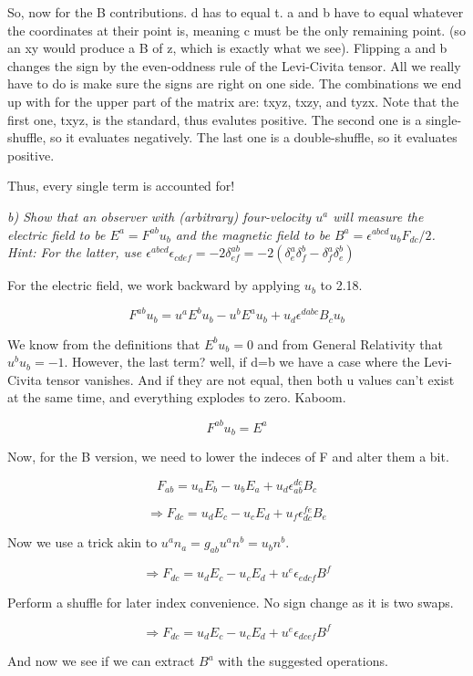 \documentclass[landscape,letterpaper,10pt,english]{article}
\begin{document}
So, now for the B contributions. d has to equal t. a and b have to equal
whatever the coordinates at their point is, meaning c must be the only
remaining point. (so an xy would produce a B of z, which is exactly what
we see). Flipping a and b changes the sign by the even-oddness rule of
the Levi-Civita tensor. All we really have to do is make sure the signs
are right on one side. The combinations we end up with for the upper
part of the matrix are: txyz, txzy, and tyzx. Note that the first one,
txyz, is the standard, thus evalutes positive. The second one is a
single-shuffle, so it evaluates negatively. The last one is a
double-shuffle, so it evaluates positive.

Thus, every single term is accounted for!

    \emph{b) Show that an observer with (arbitrary) four-velocity \(u^a\)
will measure the electric field to be \(E^a = F^{ab}u_b\) and the
magnetic field to be \(B^a = \epsilon^{abcd}u_b F_{dc}/2\). Hint: For
the latter, use
\(\epsilon^{abcd}\epsilon_{cdef} = -2\delta^{ab}_{ef} = -2(\delta^a_e\delta^b_f - \delta^a_f \delta^b_e)\)}

    For the electric field, we work backward by applying \(u_b\) to 2.18.

\[ F^{ab}u_b = u^aE^bu_b - u^bE^au_b + u_d\epsilon^{dabc} B_cu_b \]

We know from the definitions that \(E^bu_b=0\) and from General
Relativity that \(u^bu_b=-1\). However, the last term? well, if d=b we
have a case where the Levi-Civita tensor vanishes. And if they are not
equal, then both u values can't exist at the same time, and everything
explodes to zero. Kaboom.

\[ F^{ab}u_b = E^a \]

    Now, for the B version, we need to lower the indeces of F and alter them
a bit.

\[ F_{ab} = u_aE_b - u_bE_a + u_d\epsilon^{dc}_{ab} B_c \]

\[ \Rightarrow F_{dc} = u_dE_c - u_cE_d + u_f\epsilon^{fe}_{dc} B_e \]

Now we use a trick akin to \(u^an_a = g_{ab}u^an^b = u_bn^b\).

\[ \Rightarrow F_{dc} = u_dE_c - u_cE_d + u^e\epsilon_{edcf} B^f \]

Perform a shuffle for later index convenience. No sign change as it is
two swaps.

\[ \Rightarrow F_{dc} = u_dE_c - u_cE_d + u^e\epsilon_{dcef} B^f \]

    And now we see if we can extract \(B^a\) with the suggested operations.
\end{document}
